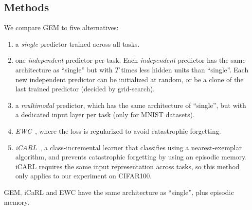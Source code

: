 \documentclass{article}
\begin{document}
\subsection{Methods}
We compare GEM to five alternatives:
\begin{enumerate}
  \item a {\em single} predictor trained across all tasks.
  \item one \emph{independent} predictor per task. Each \emph{independent}
  predictor has the same architecture as ``single'' but with $T$ times less
  hidden units than ``single''. Each new independent predictor can be
  initialized at   random, or be a clone of the last trained predictor (decided
  by grid-search).
  \item a \emph{multimodal} predictor, which has the same architecture of
  ``single'', but with a dedicated input layer per task (only for MNIST
  datasets). 
  \item \emph{EWC}~\citep{ewc}, where the loss is regularized to avoid
  catastrophic forgetting.
  \item \emph{iCARL}~\citep{icarl}, a class-incremental learner that classifies
  using a nearest-exemplar algorithm, and prevents catastrophic forgetting by
  using an episodic memory. iCARL requires the same input representation across
  tasks, so this method only applies to our experiment on CIFAR100. 
\end{enumerate}
GEM, iCaRL and EWC have the same architecture as ``single'', plus episodic memory. 
\end{document}
